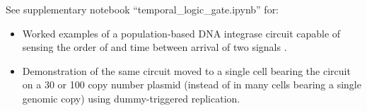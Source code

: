 \documentclass[journal = jacsat,manuscript = note]{achemso}
\begin{document}
See supplementary notebook ``temporal\_logic\_gate.ipynb'' for:

\begin{itemize}
	\item Worked examples of a population-based DNA integrase circuit capable of sensing the order of and time between arrival of two signals \cite{hsiao2016}.
	\item Demonstration of the same circuit moved to a single cell bearing the circuit on a 30 or 100 copy number plasmid (instead of in many cells bearing a single genomic copy) using dummy-triggered replication.
\end{itemize}


\end{document}
